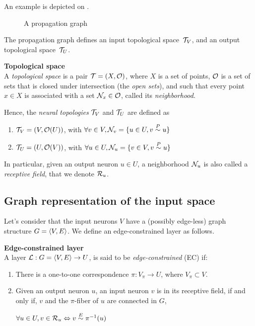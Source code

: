 An example is depicted on .

\begin{figure}[H]
\centering
{}
\caption{A propagation graph}
\label{fig:pgraph}
\end{figure}


The propagation graph defines an input topological space~$\mathcal{T}_V$, and an output topological space~$\mathcal{T}_U$.

\begin{definition}\textbf{Topological space}\\
A \emph{topological space} is a pair $\mathcal{T} = (X, \mathcal{O})$, where $X$ is a set of points, $\mathcal{O}$ is a set of sets that is closed under intersection (the \emph{open sets}), and such that every point $x \in X$ is associated with a set $\mathcal{N}_x \in \mathcal{O}$, called its \emph{neighborhood}.
\end{definition}

Hence, the \emph{neural topologies} $\mathcal{T}_V$ and $\mathcal{T}_U$ are defined as
\begin{enumerate}
\item $\mathcal{T}_V = (V, \mathcal{O}(U))$, with $\forall v \in V, \mathcal{N}_v = \{u \in U, v \overset{P}\sim u \}$
\item $\mathcal{T}_U = (U, \mathcal{O}(V))$, with $\forall u \in U, \mathcal{N}_u = \{v \in V, v \overset{P}\sim u \}$
\end{enumerate}

In particular, given an output neuron $u \in U$, a neighborhood $\mathcal{N}_u$ is also called a \emph{receptive field}, that we denote $\mathcal{R}_u$.

\subsection{Graph representation of the input space}

Let's consider that the input neurons $V$ have a (possibly edge-less) graph structure $G = \langle V, E \rangle$. We define an edge-constrained layer as follows.

\begin{definition}\textbf{Edge-constrained layer}\\
A layer $\mathcal{L}: G = \langle V, E \rangle \rightarrow U$, is said to be \emph{edge-constrained} (EC) if:
\begin{enumerate}
  \item There is a one-to-one correspondence $\pi: V_\pi \rightarrow U$, where $V_\pi \subset V$.
  \item Given an output neuron $u$, an input neuron $v$ is in its receptive field, if and only if, $v$ and the $\pi$-fiber of $u$ are connected in $G$,\\
  \centerline{\ie $\forall u \in U, v \in \mathcal{R}_u \Leftrightarrow v \overset{E}\sim \pi^{-1}(u) $}
\end{enumerate}
\end{definition}

